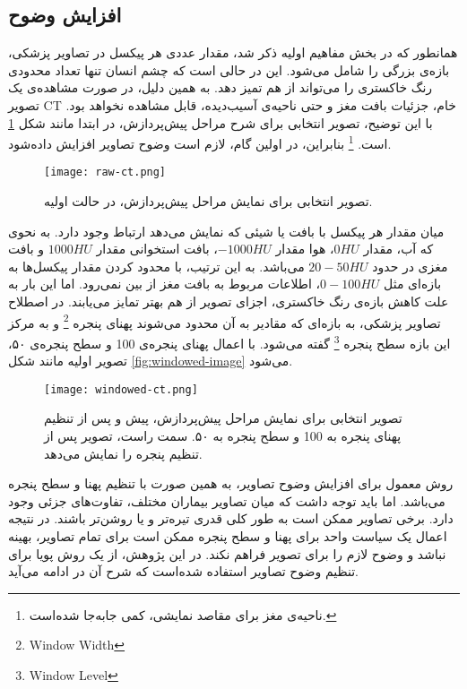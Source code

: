 \subsection{افزایش وضوح}
همانطور که در بخش مفاهیم اولیه ذکر شد، مقدار عددی هر پیکسل در تصاویر پزشکی، بازه‌ی بزرگی را شامل می‌شود.
این در حالی است که چشم انسان تنها تعداد محدودی رنگ خاکستری را می‌تواند از هم تمیز دهد.
به همین دلیل، در صورت مشاهده‌ی یک تصویر CT خام، جزئیات بافت مغز و حتی ناحیه‌ی آسیب‌دیده، قابل مشاهده نخواهد بود. 
با این توضیح، تصویر انتخابی برای شرح مراحل پیش‌پردازش، در ابتدا مانند 
شکل \ref{fig:raw-ct} است.
\footnote{ناحیه‌ی مغز برای مقاصد نمایشی، کمی جا‌به‌جا شده‌است.}
بنابراین، در اولین گام، لازم است وضوح تصاویر افزایش داده‌شود.\\

\begin{figure}[ht]
\centering
\texttt{[image: raw-ct.png]}
\caption[]{تصویر انتخابی برای نمایش مراحل پیش‌پردازش، در حالت اولیه.}
\label{fig:raw-ct}
\end{figure}

 میان مقدار هر پیکسل با بافت یا شیئی که نمایش می‌دهد ارتباط وجود دارد.
به نحوی که آب، مقدار $0 HU$، هوا مقدار $-1000 HU$، بافت استخوانی مقدار $1000 HU$ و بافت مغزی در حدود $20-50 HU$ می‌باشد.
به این ترتیب، با محدود کردن مقدار پیکسل‌ها به بازه‌ای مثل $0-100 HU$، اطلاعات مربوط به بافت مغز از بین نمی‌رود.
اما این بار به علت کاهش بازه‌ی رنگ خاکستری، اجزای تصویر از هم بهتر تمایز می‌یابند.
در اصطلاح تصاویر پزشکی، به بازه‌ای که مقادیر به آن محدود می‌شوند پهنای پنجره 
\footnote{Window Width}
و به مرکز این بازه سطح پنجره 
\footnote{Window Level} گفته می‌شود.
با اعمال پهنای پنجره‌ی 100 و سطح پنجره‌ی ۵۰، تصویر اولیه مانند شکل 
\ref{fig:windowed-image}
می‌شود.\\

\begin{figure}[ht]
\centering
\texttt{[image: windowed-ct.png]}
\caption[]{تصویر انتخابی برای نمایش مراحل پیش‌پردازش، پیش و پس از تنظیم پهنای پنجره به 100 و سطح پنجره به ۵۰. سمت راست، تصویر پس از تنظیم پنجره را نمایش می‌دهد.}
\label{fig:windowed-ct}
\end{figure}

روش معمول برای افزایش وضوح تصاویر، به همین صورت با تنظیم پهنا و سطح پنجره می‌باشد.
اما باید توجه داشت که میان تصاویر بیماران مختلف، تفاوت‌های جزئی وجود دارد.
برخی تصاویر ممکن است به طور کلی قدری تیره‌تر و یا روشن‌تر باشند.
در نتیجه اعمال یک سیاست واحد برای پهنا و سطح پنجره ممکن است برای تمام تصاویر، بهینه نباشد و وضوح لازم را برای تصویر فراهم نکند.
در این پژوهش، از یک روش پویا برای تنظیم وضوح تصاویر استفاده شده‌است که شرح آن در ادامه می‌آید.\\

